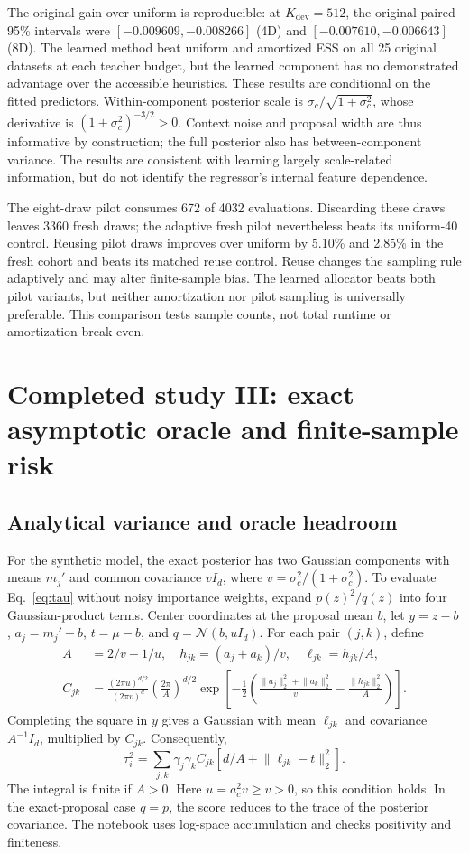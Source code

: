 \documentclass[11pt,letterpaper]{article}
\newcommand{\N}{\mathcal N}
\newcommand{\norm}[1]{\lVert #1\rVert_2}
\newcommand{\dev}{K_{\mathrm{dev}}}
\begin{document}
The original gain over uniform is reproducible: at $\dev=512$, the original paired 95\% intervals were $[-0.009609,-0.008266]$ (4D) and $[-0.007610,-0.006643]$ (8D). The learned method beat uniform and amortized ESS on all 25 original datasets at each teacher budget, but the learned component has no demonstrated advantage over the accessible heuristics. These results are conditional on the fitted predictors. Within-component posterior scale is $\sigma_c/\sqrt{1+\sigma_c^2}$, whose derivative is $(1+\sigma_c^2)^{-3/2}>0$. Context noise and proposal width are thus informative by construction; the full posterior also has between-component variance. The results are consistent with learning largely scale-related information, but do not identify the regressor's internal feature dependence.

The eight-draw pilot consumes 672 of 4032 evaluations. Discarding these draws leaves 3360 fresh draws; the adaptive fresh pilot nevertheless beats its uniform-40 control. Reusing pilot draws improves over uniform by 5.10\% and 2.85\% in the fresh cohort and beats its matched reuse control. Reuse changes the sampling rule adaptively and may alter finite-sample bias. The learned allocator beats both pilot variants, but neither amortization nor pilot sampling is universally preferable. This comparison tests sample counts, not total runtime or amortization break-even.
\clearpage
\section{Completed study III: exact asymptotic oracle and finite-sample risk}
\subsection{Analytical variance and oracle headroom}
For the synthetic model, the exact posterior has two Gaussian components with means $m_j'$ and common covariance $vI_d$, where $v=\sigma_c^2/(1+\sigma_c^2)$. To evaluate Eq.~\eqref{eq:tau} without noisy importance weights, expand $p(z)^2/q(z)$ into four Gaussian-product terms. Center coordinates at the proposal mean $b$, let $y=z-b$, $a_j=m_j'-b$, $t=\mu-b$, and $q=\N(b,u I_d)$. For each pair $(j,k)$, define
\begin{align}
 A&=2/v-1/u,\quad h_{jk}=(a_j+a_k)/v,\quad \ell_{jk}=h_{jk}/A,\\
 C_{jk}&=\frac{(2\pi u)^{d/2}}{(2\pi v)^d}\left(\frac{2\pi}{A}\right)^{d/2}
 \exp\!\left[-\frac12\left(\frac{\norm{a_j}^2+\norm{a_k}^2}{v}-\frac{\norm{h_{jk}}^2}{A}\right)\right].
\end{align}
Completing the square in $y$ gives a Gaussian with mean $\ell_{jk}$ and covariance $A^{-1}I_d$, multiplied by $C_{jk}$. Consequently,
\begin{equation}
 \boxed{\tau_i^2=\sum_{j,k}\gamma_j\gamma_k C_{jk}\left[d/A+\norm{\ell_{jk}-t}^{2}\right].}
\end{equation}
The integral is finite if $A>0$. Here $u=a_c^2v\geq v>0$, so this condition holds. In the exact-proposal case $q=p$, the score reduces to the trace of the posterior covariance. The notebook uses log-space accumulation and checks positivity and finiteness.
\end{document}
